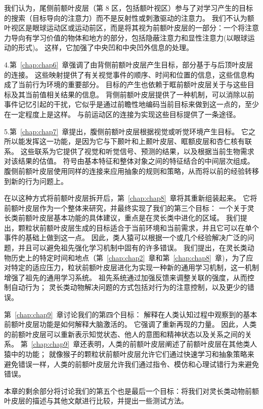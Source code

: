 我们认为，尾侧前额叶皮层（第 8 区，包括额叶视区）参与了对学习产生的目标的搜索（目标导向的注意力）而不是反射性或刺激驱动的注意力。
我们不认为额叶视区是眼球运动区或运动前区，而是将其视为前额叶皮层的一部分：一个将注意力导向有学习价值的物体和地方的部分，包括隐蔽注意力和显性注意力(以眼球运动的形式)。
这样，它加强了中央凹和中央凹外信息的处理。
\par 
4.第~\ref{chap:chap6}~章强调了由背侧前额叶皮层产生目标，部分基于与后顶叶皮层的连接。
这些映射提供了有关视觉事件的顺序、时间和位置的信息，这些信息构成了当前行为环境的重要部分。
目标的产生也依赖于眶前额叶皮层关于与这些目标及其当前值相关结果的信息。
背侧前额叶皮层提供了一种机制，可以消除以前事件记忆引起的干扰，它似乎是通过前瞻性地编码当前目标来做到这一点的，至少在一定程度上是这样。
与前运动区的连接为实现这些目标提供了一条途径。
\par 
5.第~\ref{chap:chap7}~章提出，腹侧前额叶皮层根据视觉或听觉环境产生目标。
它之所以能发挥这一功能，是因为它与下颞叶和上颞叶皮层、眶额皮层和杏仁核有联系。
这些联系为它提供了视觉和听觉信号、预测的结果，以及根据当前生物需求对该结果的估值。
符号由基本特征和整体对象之间的特征结合的中间层次组成。
腹侧前额叶皮层使用同样的连接来应用抽象的规则和策略，从而将以前的经验转移到新的行为问题上。
\par 
在以这种方式将前额叶皮层拆开后，第~\ref{chap:chap8}~章将其重新组装起来。
它将前额叶皮层作为一个整体来研究，并最终实现了我们的第三个目标：
一个关于灵长类前额叶皮层基本功能的具体建议，重点是在灵长类中进化的区域。
我们提出，颗粒状前额叶皮层生成的目标适合于当前环境和当前需求，并且它可以在单个事件的基础上做到这一点。
因此，类人猿可以根据一个或几个经验解决广泛的问题，并且可以避免祖先强化学习机制中固有的许多错误。
我们提出，在灵长类动物历史上的特定时间和地点（第~\ref{chap:chap2}~章和第~\ref{chap:chap8}~章)，为了应对特定的适应压力，粒状前额叶皮层进化为实现一种新的通用学习机制，这一机制增强了祖先的通用学习系统。
祖先系统通过加强反馈来调整关联的强度，从而控制自动行为；
灵长类动物解决问题的方式包括对行为的注意控制，以及更少的错误。
\par 
第~\ref{chap:chap9}~章讨论我们的第四个目标：
解释在人类认知过程中观察到的基本前额叶皮层功能是如何解释大脑激活的。
它强调了重新再现的力量。
因此，人类的前额叶皮层可以重新表示知觉状态、他人的意图和精神状态以及关系之间的关系。
第~\ref{chap:chap9}~章还表明，人类的前额叶皮层阐述了前额叶皮层在其他类人猿中的功能；
就像猴子的颗粒状前额叶皮层允许它们通过快速学习和抽象策略来避免错误一样，人类的前额叶皮层允许我们通过指令、模仿和心理试错行为来避免错误。
\par 
本章的剩余部分将讨论我们的第五个也是最后一个目标：将我们对灵长类动物前额叶皮层的描述与其他文献进行比较，并提出一些测试方法。
